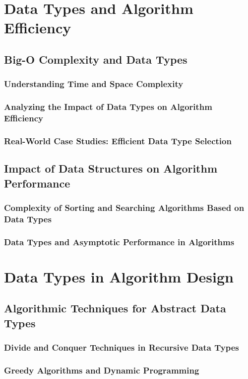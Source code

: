 \documentclass[12pt, oneside]{book}
\begin{document}
\section{Data Types and Algorithm Efficiency}
\subsection{Big-O Complexity and Data Types}
\subsubsection{Understanding Time and Space Complexity}
\subsubsection{Analyzing the Impact of Data Types on Algorithm Efficiency}
\subsubsection{Real-World Case Studies: Efficient Data Type Selection}
\subsection{Impact of Data Structures on Algorithm Performance}
\subsubsection{Complexity of Sorting and Searching Algorithms Based on Data Types}
\subsubsection{Data Types and Asymptotic Performance in Algorithms}
\section{Data Types in Algorithm Design}
\subsection{Algorithmic Techniques for Abstract Data Types}
\subsubsection{Divide and Conquer Techniques in Recursive Data Types}
\subsubsection{Greedy Algorithms and Dynamic Programming}
\end{document}
